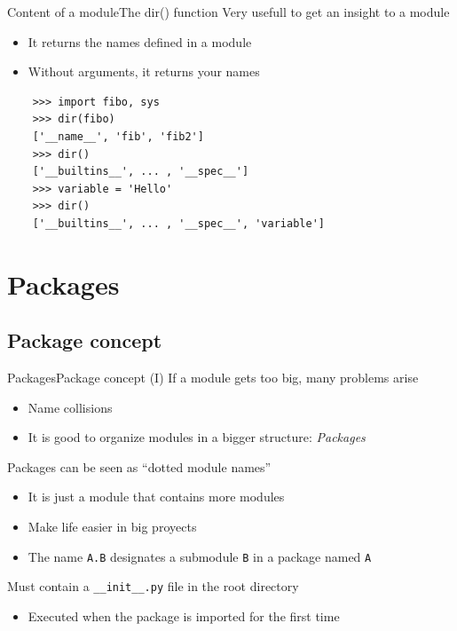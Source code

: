 \documentclass[10pt,compress]{beamer} %
\begin{document}
\begin{frame}[fragile]{Content of a module}{The dir() function}
	Very usefull to get an insight to a module
	\begin{itemize}
		\item It returns the names defined in a module
		\item Without arguments, it returns your names
	\end{itemize}
	\begin{block}{}
	\begin{verbatim}
	>>> import fibo, sys
	>>> dir(fibo)
	['__name__', 'fib', 'fib2']
	>>> dir()
	['__builtins__', ... , '__spec__']
	>>> variable = 'Hello'
	>>> dir()
	['__builtins__', ... , '__spec__', 'variable']
	\end{verbatim}
	\vspace{-0.2cm}
	\end{block}
\end{frame}

\section{Packages}
\subsection{Package concept}
\begin{frame}{Packages}{Package concept (I)}
		If a module gets too big, many problems arise
			\begin{itemize}
			\item Name collisions
			\item It is good to organize modules in a bigger structure: \textit{Packages}
			\end{itemize}
		Packages can be seen as ``dotted module names''
			\begin{itemize}
			\item It is just a module that contains more modules
			\item Make life easier in big proyects
			\item The name \texttt{A.B} designates a submodule \texttt{B} in a package named \texttt{A}
			\end{itemize}
		Must contain a \texttt{\_\_init\_\_.py} file in the root directory
			\begin{itemize}
			\item Executed when the package is imported for the first time
			\end{itemize}
\end{frame}
\end{document}
